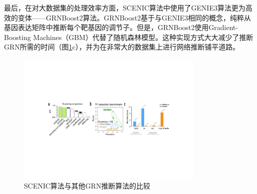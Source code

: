   最后，在对大数据集的处理效率方面，SCENIC算法中使用了GENIE3算法\cite{huynh2010inferring}更为高效的变体——GRNBoost2算法\cite{moerman2019grnboost2}。GRNBoost2基于与GENIE3相同的概念，纯粹从基因表达矩阵中推断每个靶基因的调节子。但是，GRNBoost2使用Gradient-Boosting Machines（GBM）\cite{friedman2001greedy}代替了随机森林模型。这种实现方式大大减少了推断GRN所需的时间（图\ref{fig:scenic-prt}c），并为在非常大的数据集上进行网络推断铺平道路。

\begin{figure}[!htb]
  \centering
  \includegraphics[width=0.8\textwidth]{figs/scenic-prt.pdf}
  \caption{SCENIC算法与其他GRN推断算法的比较}
  \label{fig:scenic-prt}
\end{figure}

